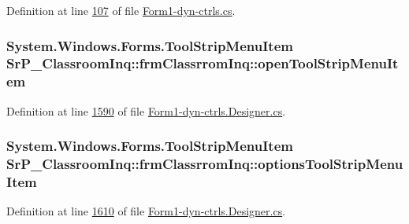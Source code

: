 \-Definition at line \hyperlink{_form1-dyn-ctrls_8cs_source_l00107}{107} of file \hyperlink{_form1-dyn-ctrls_8cs_source}{\-Form1-\/dyn-\/ctrls.\-cs}.

\hypertarget{class_sr_p___classroom_inq_1_1frm_classrrom_inq_aabb3ca13577ddb31c75bcd459c075263}{
\subsubsection[{open\-Tool\-Strip\-Menu\-Item}]{\setlength{\rightskip}{0pt plus 5cm}\-System.\-Windows.\-Forms.\-Tool\-Strip\-Menu\-Item {\bf \-Sr\-P\-\_\-\-Classroom\-Inq\-::frm\-Classrrom\-Inq\-::open\-Tool\-Strip\-Menu\-Item}}}
\label{class_sr_p___classroom_inq_1_1frm_classrrom_inq_aabb3ca13577ddb31c75bcd459c075263}


\-Definition at line \hyperlink{_form1-dyn-ctrls_8_designer_8cs_source_l01590}{1590} of file \hyperlink{_form1-dyn-ctrls_8_designer_8cs_source}{\-Form1-\/dyn-\/ctrls.\-Designer.\-cs}.

\hypertarget{class_sr_p___classroom_inq_1_1frm_classrrom_inq_acdc1111ba8acc3bb1ee140845f069521}{
\subsubsection[{options\-Tool\-Strip\-Menu\-Item}]{\setlength{\rightskip}{0pt plus 5cm}\-System.\-Windows.\-Forms.\-Tool\-Strip\-Menu\-Item {\bf \-Sr\-P\-\_\-\-Classroom\-Inq\-::frm\-Classrrom\-Inq\-::options\-Tool\-Strip\-Menu\-Item}}}
\label{class_sr_p___classroom_inq_1_1frm_classrrom_inq_acdc1111ba8acc3bb1ee140845f069521}


\-Definition at line \hyperlink{_form1-dyn-ctrls_8_designer_8cs_source_l01610}{1610} of file \hyperlink{_form1-dyn-ctrls_8_designer_8cs_source}{\-Form1-\/dyn-\/ctrls.\-Designer.\-cs}.

